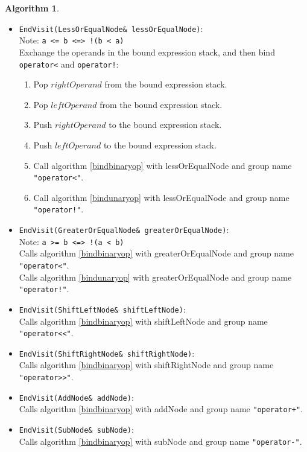 \documentclass[a4paper,oneside,11pt]{book}
\theoremstyle{definition}
\newtheorem{algo}{Algorithm}[section]
\begin{document}
\begin{algo}
\begin{itemize}
\begin{enumerate}
\end{enumerate}
\item
\verb|EndVisit(LessOrEqualNode& lessOrEqualNode)|:\\
Note: \verb|a <= b <=> !(b < a)|\\
Exchange the operands in the bound expression stack, and then bind \verb|operator<| and \verb|operator!|:
\begin{enumerate}
\item
Pop $rightOperand$ from the bound expression stack.
\item
Pop $leftOperand$ from the bound expression stack.
\item
Push $rightOperand$ to the bound expression stack.
\item
Push $leftOperand$ to the bound expression stack.
\item
Call algorithm \ref{bindbinaryop} with lessOrEqualNode and group name \verb|"operator<"|.
\item
Call algorithm \ref{bindunaryop} with lessOrEqualNode and group name \verb|"operator!"|.
\end{enumerate}
\item
\verb|EndVisit(GreaterOrEqualNode& greaterOrEqualNode)|:\\
Note: \verb|a >= b <=> !(a < b)|\\
Calls algorithm \ref{bindbinaryop} with greaterOrEqualNode and group name \verb|"operator<"|.\\
Calls algorithm \ref{bindunaryop} with greaterOrEqualNode and group name \verb|"operator!"|.\\
\item
\verb|EndVisit(ShiftLeftNode& shiftLeftNode)|:\\
Calls algorithm \ref{bindbinaryop} with shiftLeftNode and group name \verb|"operator<<"|.\\
\item
\verb|EndVisit(ShiftRightNode& shiftRightNode)|:\\
Calls algorithm \ref{bindbinaryop} with shiftRightNode and group name \verb|"operator>>"|.\\
\item
\verb|EndVisit(AddNode& addNode)|:\\
Calls algorithm \ref{bindbinaryop} with addNode and group name \verb|"operator+"|.\\
\item
\verb|EndVisit(SubNode& subNode)|:\\
Calls algorithm \ref{bindbinaryop} with subNode and group name \verb|"operator-"|.\\

\end{itemize}
\end{algo}
\end{document}
